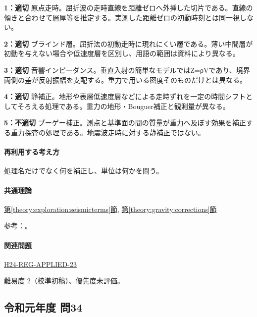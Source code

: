 \noindent\textbf{1：適切} 原点走時。屈折波の走時直線を距離ゼロへ外挿した切片である。直線の傾きと合わせて層厚等を推定する。実測した距離ゼロの初動時刻とは同一視しない。\par

\noindent\textbf{2：適切} ブラインド層。屈折法の初動走時に現れにくい層である。薄い中間層が初動を与えない場合や低速度層を区別し、用語の範囲は資料により異なる。\par

\noindent\textbf{3：適切} 音響インピーダンス。垂直入射の簡単なモデルではZ=ρVであり、境界両側の差が反射振幅を支配する。重力で用いる密度そのものだけとは異なる。\par

\noindent\textbf{4：適切} 静補正。地形や表層低速度層などによる走時ずれを一定の時間シフトとしてそろえる処理である。重力の地形・Bouguer補正と観測量が異なる。\par

\noindent\textbf{5：不適切} ブーゲー補正。測点と基準面の間の質量が重力へ及ぼす効果を補正する重力探査の処理である。地震波走時に対する静補正ではない。\par

\paragraph{再利用する考え方} 処理名だけでなく何を補正し、単位は何かを問う。

\paragraph{共通理論} \hyperref[theory:exploration:seismicterms]{第\ref*{theory:exploration:seismicterms}節}, \hyperref[theory:gravity:corrections]{第\ref*{theory:gravity:corrections}節}

\par 参考：\cite{usgs_refraction2013,epa_seismic_reflection,usgs_static2004,usgs_processing2000}。

\paragraph{関連問題} \hyperref[q:h24-reg-applied-23]{H24-REG-APPLIED-23}

\par 難易度 2（校準初稿）、優先度未評価。

\subsection{令和元年度 問34}
\label{q:r01-reg-applied-34}


